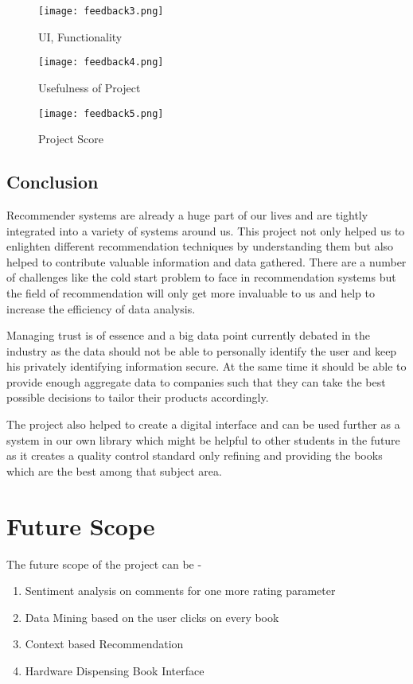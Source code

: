 \documentclass[a4paper,12pt]{report}
\begin{document}
\FloatBarrier
\begin{figure}[h!]
  \centering
  \texttt{[image: feedback3.png]}
  \caption{UI, Functionality }
\end{figure}

\FloatBarrier
\begin{figure}[h!]
  \centering
  \texttt{[image: feedback4.png]}
  \caption{Usefulness of Project}
\end{figure}

\FloatBarrier
\begin{figure}[h!]
  \centering
  \texttt{[image: feedback5.png]}
  \caption{Project Score}
\end{figure}


\section{Conclusion}
\par Recommender systems are already a huge part of our lives and are tightly integrated into a variety of systems around us. This project not only helped us to enlighten different recommendation techniques by understanding them but also helped to contribute valuable information and data gathered. There are a number of challenges like the cold start problem to face in recommendation systems but the field of recommendation will only get more invaluable to us and help to increase the efficiency of data analysis.\\

\par Managing trust is of essence and a big data point currently debated in the industry as the data should not be able to personally identify the user and keep his privately identifying information secure. At the same time it should be able to provide enough aggregate data to companies such that they can take the best possible decisions to tailor their products accordingly.\\

\par The project also helped to create a digital interface and can be used further as a system in our own library which might be helpful to other students in the future as it creates a quality control standard only refining and providing the books which are the best among that subject area. \\

\chapter{Future Scope}
\par The future scope of the project can be -
\begin{enumerate}
  \item Sentiment analysis on comments for one more rating parameter
  \item Data Mining based on the user clicks on every book
  \item Context based Recommendation
  \item Hardware Dispensing Book Interface
\end{enumerate}
\end{document}

